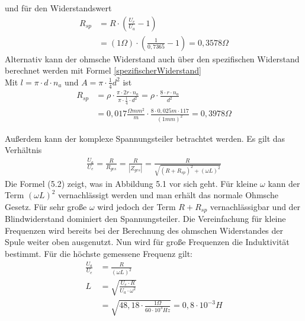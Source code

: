     und für den Widerstandswert 
    \begin{align*}
	R_{sp} &= R\cdot \left(\frac{U_e}{U_a} -1\right) \\
   	& =  (1 \Omega) \cdot (\frac{1}{0,7365} - 1) =  0,3578 \Omega
\end{align*}
    Alternativ kann der ohmsche Widerstand auch über den spezifischen Widerstand berechnet werden mit Formel \eqref{spezifischerWiderstand} \\
    Mit $l = \pi \cdot d \cdot n_a$ und $A = \pi \cdot \frac{1}{4} d^2$ ist
    \begin{align*}
    	R_{sp}&=\rho\cdot\frac{\pi\cdot 2 r\cdot n_a}{\pi\cdot\frac{1}{4}\cdot d^2} = \rho\cdot\frac{8\cdot r\cdot n_a}{d^2} \\
        &=0,017 \frac{\Omega mm^2}{m}\cdot\frac{8\cdot 0,025m \cdot 117}{(1mm)^2} =  0,3978 \Omega
	\end{align*}
    
    Außerdem kann der komplexe Spannungsteiler betrachtet werden. Es gilt das Verhältnis \begin{align}
    \frac{U_a}{U_e} = \frac{R}{R_{ges}} = \frac{R}{|Z_{ges}|} = \frac{R}{\sqrt{(R + R_{sp})^2 + (\omega L)^2}}
    \end{align}
    Die Formel (5.2) zeigt, was in Abbildung 5.1 vor sich geht. Für kleine $\omega$ kann der Term $(\omega L)^2$ vernachlässigt werden und man erhält das normale Ohmsche Gesetz. Für sehr große $\omega$ wird jedoch der Term $R + R_{sp}$ vernachlässigbar und der Blindwiderstand dominiert den Spannungsteiler. Die Vereinfachung für kleine Frequenzen wird bereits bei der Berechnung des ohmschen Widerstandes der Spule weiter oben ausgenutzt. Nun wird für große Frequenzen die Induktivität bestimmt. Für die höchste gemessene Frequenz gilt:
    \begin{align*}
    	\frac{U_a}{U_e} &= \frac{R}{(\omega L)^2} \\
    	L & = \sqrt{\frac{U_e \cdot R}{U_a \cdot \omega^2}} \\
    &= \sqrt{48,18 \cdot\frac{1 \Omega}{60\cdot 10^3 Hz}} = 0,8 \cdot 10^{-3} H 
    \end{align*} 
